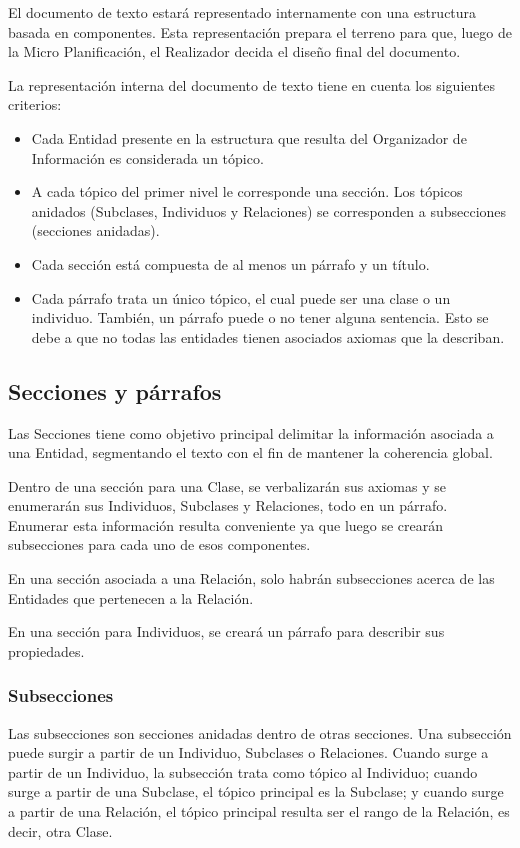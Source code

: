 El documento de texto estará representado internamente con una estructura basada en componentes. Esta representación prepara el terreno para que, luego de la Micro Planificación, el Realizador decida el diseño final del documento.

La representación interna del documento de texto tiene en cuenta los siguientes criterios:
\begin{itemize}
    \item Cada Entidad presente en la estructura que resulta del Organizador de Información es considerada un tópico. 
    \item A cada tópico del primer nivel le corresponde una sección. Los tópicos anidados (Subclases, Individuos y Relaciones) se corresponden a subsecciones (secciones anidadas).
    \item Cada sección está compuesta de al menos un párrafo y un título.
    \item Cada párrafo trata un único tópico, el cual puede ser una clase o un individuo. También, un párrafo puede o no tener alguna sentencia. Esto se debe a que no todas las entidades tienen asociados axiomas que la describan.
\end{itemize}

\subsection{Secciones y párrafos}
Las Secciones tiene como objetivo principal delimitar la información asociada a una Entidad, segmentando el texto con el fin de mantener la coherencia global.

Dentro de una sección para una Clase, se verbalizarán sus axiomas y se enumerarán sus Individuos, Subclases y Relaciones, todo en un párrafo. Enumerar esta información resulta conveniente ya que luego se crearán subsecciones para cada uno de esos componentes.

En una sección asociada a una Relación, solo habrán subsecciones acerca de las Entidades que pertenecen a la Relación.

En una sección para Individuos, se creará un párrafo para describir sus propiedades.

\subsubsection{Subsecciones}
Las subsecciones son secciones anidadas dentro de otras secciones. Una subsección puede surgir a partir de un Individuo, Subclases o Relaciones. Cuando surge a partir de un Individuo, la subsección trata como tópico al Individuo; cuando surge a partir de una Subclase, el tópico principal es la Subclase; y cuando surge a partir de una Relación, el tópico principal resulta ser el rango de la Relación, es decir, otra Clase.

